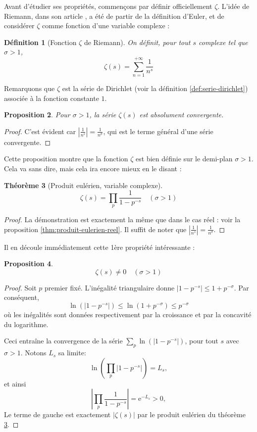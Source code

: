 \documentclass[french]{report}
\newtheorem{theorem}{Théorème}[section]
\newtheorem{definition}[theorem]{Définition}
\newtheorem{proposition}[theorem]{Proposition}
\begin{document}
Avant d'étudier ses propriétés, commençons par définir officiellement $\zeta$. L'idée de Riemann, dans son article \cite{riemann}, a été de partir de la définition d'Euler, et de considérer $\zeta$ comme fonction d'une variable complexe :

\begin{definition}[Fonction $\zeta$ de Riemann]\label{def:zeta-definition}
  On définit, pour tout $s$ complexe tel que $\sigma > 1$,
  \[ \zeta(s) = \sum_{n=1}^{+\infty}\frac{1}{n^s} \]
\end{definition}

Remarquons que $\zeta$ est la série de Dirichlet (voir la définition \ref{def:serie-dirichlet}) associée à la fonction constante $1$.

\begin{proposition}
  Pour $\sigma > 1$, la série $\zeta(s)$ est absolument convergente.
\end{proposition}

\begin{proof}
  C'est évident car $|\frac{1}{n^s}| = \frac{1}{n^{\sigma}}$, qui est le terme général d'une série convergente.
\end{proof}

Cette proposition montre que la fonction $\zeta$ est bien définie sur le demi-plan $\sigma > 1$.
\\

Cela va sans dire, mais cela ira encore mieux en le disant :

\begin{theorem}[Produit eulérien, variable complexe]\label{thm:produit-eulerien-complexe}
  \[ \zeta(s) = \prod_p\frac{1}{1-p^{-s}}\quad(\sigma>1)\]
\end{theorem}

\begin{proof}
  La démonstration est exactement la même que dans le cas réel : voir la proposition \ref{thm:produit-eulerien-reel}. Il suffit de noter que $|\frac{1}{n^s}|=\frac{1}{n^\sigma}$.
\end{proof}

Il en découle immédiatement cette 1ère propriété intéressante :

\begin{proposition}\label{eq:zeta-non-nul-produit-eulerien}
  \[ \zeta(s) \neq 0 \quad(\sigma > 1)\]
\end{proposition}

\begin{proof}
  Soit $p$ premier fixé. L'inégalité triangulaire donne $|1-p^{-s}|\leq1+p^{-\sigma}$. Par conséquent,
  \[\ln(|1-p^{-s}|)\leq\ln(1+p^{-\sigma})\leq p^{-\sigma} \]
  où les inégalités sont données respectivement par la croissance et par la concavité du logarithme.

  Ceci entraîne la convergence de la série $\sum_p\ln(|1-p^{-s}|)$, pour tout $s$ avec $\sigma>1$. Notons $L_s$ sa limite:
  \[ \ln\left(\prod_p|1-p^{-s}|\right) = L_s, \]
  et ainsi
  \[ \left|\prod_p\frac{1}{1-p^{-s}}\right| = \mathrm{e}^{-L_s} > 0, \]
  Le terme de gauche est exactement $|\zeta(s)|$ par le produit eulérien du théorème \ref{thm:produit-eulerien-complexe}.

\end{proof}
\end{document}

